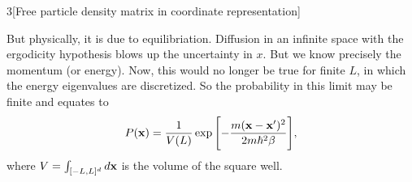 \documentclass[12pt]{article}
\begin{document}
\begin{problem}{3}[Free particle density matrix in coordinate representation]
\begin{solution}
But physically, it is due to equilibriation. Diffusion in an infinite space 
with the ergodicity hypothesis blows up the uncertainty in $x$. But we know 
precisely the momentum (or energy). Now, this would no longer be true for finite
$L$, in which the energy eigenvalues are discretized. So the probability in this
limit may be finite and equates to
\begin{equation}
    P(\vb{x})=\frac1{V(L)}\exp\qty[-\frac{m(\vb{x}-\vb{x}')^2}{2m\hbar^2\beta}],
\end{equation}
where $V=\int_{[-L,L]^d}d\vb{x}$ is the volume of the square well.
\end{solution}

\end{problem}
\newpage
\end{document}
